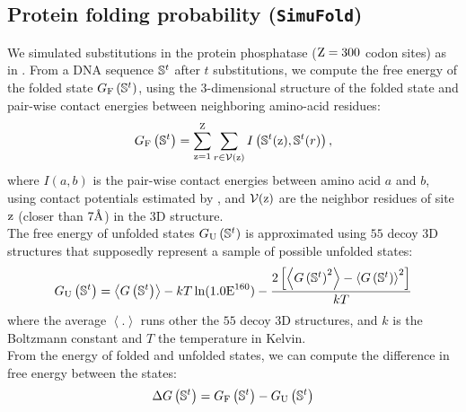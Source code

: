 \subsection{Protein folding probability (\texttt{SimuFold})}
\label{subsec:protein-folding-probability}

We simulated substitutions in the protein phosphatase ($\text{Z}=300$ {codon} sites) as in \citet{Goldstein2017}.
From a {DNA} sequence $\mathbb{S}^t$ after $t$ substitutions, we compute the free energy of the folded state $ G_{\text{F}} \left(\mathbb{S}^{t}\right)$, using the 3-dimensional structure of the folded state and pair-wise contact energies between neighboring amino-acid residues:
\begin{equation}
    G_{\text{F}} \left(\mathbb{S}^{t}\right) = \sum\limits_{\text{z}=1}^{\text{Z}} \sum\limits_{r \in \mathcal{V}(\text{z})} I \left(\mathbb{S}^t(\text{z}), \mathbb{S}^t(r) \right),
\end{equation}
where $I(a,b)$ is the pair-wise contact energies between amino acid $a$ and $b$, using contact potentials estimated by \citet{Miyazawa1985}, and $\mathcal{V}(\text{z})$ are the neighbor residues of site $\text{z}$ (closer than $7\text{\normalfont\AA}$) in the 3D structure.\\

The free energy of unfolded states $G_{\text{U}} \left(\mathbb{S}^{t}\right)$ is approximated using $55$ decoy 3D structures that supposedly represent a sample of possible unfolded states:
\begin{equation}
    G_{\text{U}} \left(\mathbb{S}^{t}\right) = \left\langle G\left(\mathbb{S}^{t}\right) \right\rangle - kT \ln (1.0\text{E}^{160}) - \dfrac{2 \left[ \left\langle G\left(\mathbb{S}^{t}\right)^2 \right\rangle - \left\langle G\left(\mathbb{S}^{t}\right) \right\rangle^2\right] }{kT}
\end{equation}
where the average $\left\langle . \right\rangle$ runs other the $55$ decoy 3D structures, and $k$ is the Boltzmann constant and $T$ the temperature in Kelvin.\\

From the energy of folded and unfolded states, we can compute the difference in free energy between the states:
\begin{equation}
    \Delta G\left(\mathbb{S}^{t}\right) = G_{\text{F}} \left(\mathbb{S}^{t}\right) - G_{\text{U}} \left(\mathbb{S}^{t}\right)
\end{equation}

